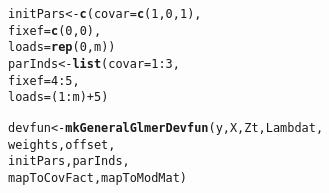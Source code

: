 \documentclass[12pt]{article}\usepackage[]{graphicx}\usepackage[]{color}
\makeatletter
\newcommand{\hlnum}[1]{\textcolor[rgb]{0.686,0.059,0.569}{#1}}%
\newcommand{\hlopt}[1]{\textcolor[rgb]{0,0,0}{#1}}%
\newcommand{\hlstd}[1]{\textcolor[rgb]{0.345,0.345,0.345}{#1}}%
\newcommand{\hlkwb}[1]{\textcolor[rgb]{0.69,0.353,0.396}{#1}}%
\newcommand{\hlkwc}[1]{\textcolor[rgb]{0.333,0.667,0.333}{#1}}%
\newcommand{\hlkwd}[1]{\textcolor[rgb]{0.737,0.353,0.396}{\textbf{#1}}}%
\newenvironment{kframe}{%
 \def\at@end@of@kframe{}%
 \ifinner\ifhmode%
  \def\at@end@of@kframe{\end{minipage}}%
  \begin{minipage}{\columnwidth}%
 \fi\fi%
 \def\FrameCommand##1{\hskip\@totalleftmargin \hskip-\fboxsep
 \colorbox{shadecolor}{##1}\hskip-\fboxsep
     \hskip-\linewidth \hskip-\@totalleftmargin \hskip\columnwidth}%
 \MakeFramed {\advance\hsize-\width
   \@totalleftmargin\z@ \linewidth\hsize
   \@setminipage}}%
 {\par\unskip\endMakeFramed%
 \at@end@of@kframe}
\newenvironment{knitrout}{}{} %
\makeatother
\begin{document}
\begin{knitrout}
\color{fgcolor}\begin{kframe}
\begin{alltt}
\hlstd{initPars} \hlkwb{<-} \hlkwd{c}\hlstd{(}\hlkwc{covar} \hlstd{=} \hlkwd{c}\hlstd{(}\hlnum{1}\hlstd{,} \hlnum{0}\hlstd{,} \hlnum{1}\hlstd{),}
              \hlkwc{fixef} \hlstd{=} \hlkwd{c}\hlstd{(}\hlnum{0}\hlstd{,} \hlnum{0}\hlstd{),}
              \hlkwc{loads} \hlstd{=} \hlkwd{rep}\hlstd{(}\hlnum{0}\hlstd{, m))}
\hlstd{parInds} \hlkwb{<-} \hlkwd{list}\hlstd{(}\hlkwc{covar} \hlstd{=} \hlnum{1}\hlopt{:}\hlnum{3}\hlstd{,}
                \hlkwc{fixef} \hlstd{=} \hlnum{4}\hlopt{:}\hlnum{5}\hlstd{,}
                \hlkwc{loads} \hlstd{= (}\hlnum{1}\hlopt{:}\hlstd{m)}\hlopt{+}\hlnum{5}\hlstd{)}
\end{alltt}
\end{kframe}
\end{knitrout}

\begin{knitrout}
\color{fgcolor}\begin{kframe}
\begin{alltt}
\hlstd{devfun} \hlkwb{<-} \hlkwd{mkGeneralGlmerDevfun}\hlstd{(y, X, Zt, Lambdat,}
                               \hlstd{weights, offset,}
                               \hlstd{initPars, parInds,}
                               \hlstd{mapToCovFact, mapToModMat)}
\end{alltt}
\end{kframe}
\end{knitrout}
\end{document}
